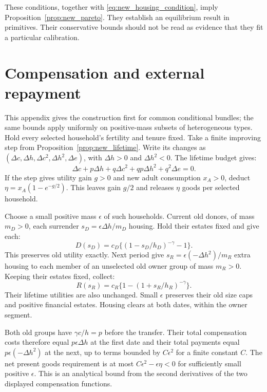\documentclass[11pt]{article}
\begin{document}
These conditions, together with \eqref{eq:new_housing_condition}, imply
Proposition~\ref{prop:new_pareto}. They establish an equilibrium result in
primitives. Their conservative bounds should not be read as evidence that
they fit a particular calibration.

\section{Compensation and external repayment}
\label{app:new_pareto}

This appendix gives the construction first for common conditional bundles;
the same bounds apply uniformly on positive-mass subsets of heterogeneous
types. Hold every selected household's fertility and tenure fixed. Take a
finite improving step from Proposition~\ref{prop:new_lifetime}. Write its
changes as $(\Delta c,\Delta h,\Delta c^2,\Delta h^2,\Delta e)$, with
$\Delta h>0$ and $\Delta h^2<0$. The lifetime budget gives:
\begin{equation}
\Delta c+p\Delta h+q\Delta c^2+qp\Delta h^2+q^2\Delta e=0.
\label{eq:new_delta_budget}
\end{equation}
If the step gives utility gain $g>0$ and new adult consumption $x_A>0$,
deduct $\eta=x_A(1-e^{-g/2})$. This leaves gain $g/2$ and releases $\eta$
goods per selected household.

Choose a small positive mass $\epsilon$ of such households. Current old
donors, of mass $m_D>0$, each surrender
$s_D=\epsilon\Delta h/m_D$ housing. Hold their estates fixed and give each:
\begin{equation}
D(s_D)=c_D\{(1-s_D/h_D)^{-\gamma}-1\}.
\end{equation}
This preserves old utility exactly. Next period give
$s_R=\epsilon(-\Delta h^2)/m_R$ extra housing to each member of an unselected
old owner group of mass $m_R>0$. Keeping their estates fixed, collect:
\begin{equation}
R(s_R)=c_R\{1-(1+s_R/h_R)^{-\gamma}\}.
\end{equation}
Their lifetime utilities are also unchanged. Small $\epsilon$ preserves their
old size caps and positive financial estates. Housing clears at both dates,
within the owner segment.

Both old groups have $\gamma c/h=p$ before the transfer. Their total
compensation costs therefore equal $p\epsilon\Delta h$ at the first date
and their total payments equal $p\epsilon(-\Delta h^2)$ at the next, up to
terms bounded by $C\epsilon^2$ for a finite constant $C$.
The net present goods requirement is at most
$C\epsilon^2-\epsilon\eta<0$ for sufficiently small positive $\epsilon$.
This is an analytical bound from the second derivatives of the two displayed
compensation functions.
\end{document}
